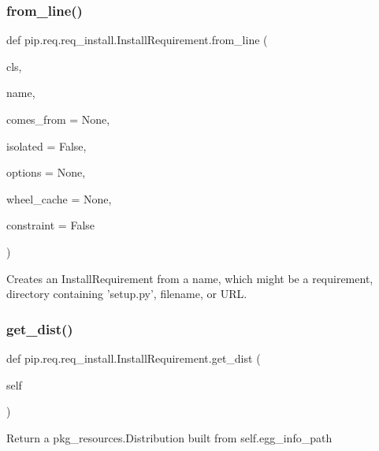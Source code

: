 \subsubsection{\texorpdfstring{from\+\_\+line()}{from\_line()}}
{\footnotesize\ttfamily def pip.\+req.\+req\+\_\+install.\+Install\+Requirement.\+from\+\_\+line (\begin{DoxyParamCaption}\item[{}]{cls,  }\item[{}]{name,  }\item[{}]{comes\+\_\+from = {\ttfamily None},  }\item[{}]{isolated = {\ttfamily False},  }\item[{}]{options = {\ttfamily None},  }\item[{}]{wheel\+\_\+cache = {\ttfamily None},  }\item[{}]{constraint = {\ttfamily False} }\end{DoxyParamCaption})}

\begin{DoxyVerb}Creates an InstallRequirement from a name, which might be a
requirement, directory containing 'setup.py', filename, or URL.
\end{DoxyVerb}
 \mbox{\label{classpip_1_1req_1_1req__install_1_1_install_requirement_a9c214581cf5d5085b433d692b0ba9c2b}} 
\subsubsection{\texorpdfstring{get\+\_\+dist()}{get\_dist()}}
{\footnotesize\ttfamily def pip.\+req.\+req\+\_\+install.\+Install\+Requirement.\+get\+\_\+dist (\begin{DoxyParamCaption}\item[{}]{self }\end{DoxyParamCaption})}

\begin{DoxyVerb}Return a pkg_resources.Distribution built from self.egg_info_path\end{DoxyVerb}
 \mbox{\label{classpip_1_1req_1_1req__install_1_1_install_requirement_a0ee852d57dff6bef1ef518d93906490b}} 
